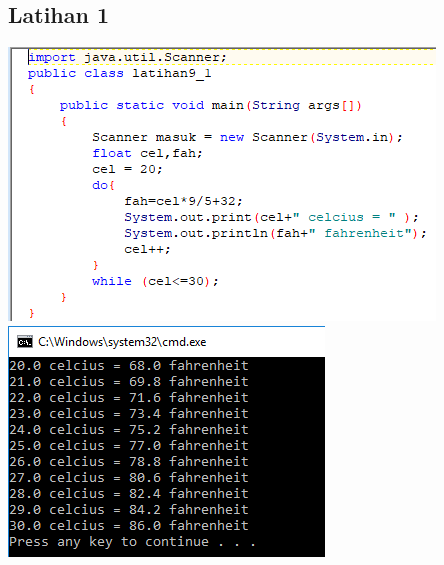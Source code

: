 \documentclass[a4paper,12pt]{article}
\begin{document}
\subsection{Latihan 1}
\begin{center}
	\includegraphics[scale=1]{Capture6}
	\includegraphics[scale=1]{Capture6_2}
\end{center}
\end{document}
